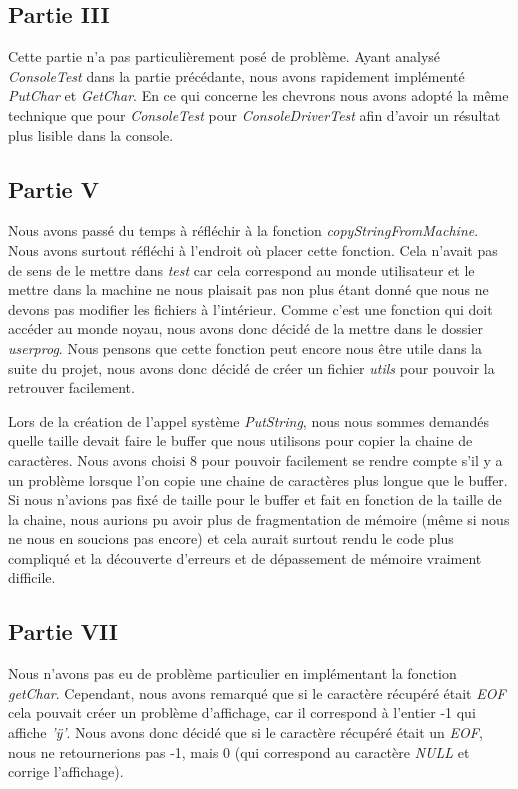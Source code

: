 \documentclass{article}
\begin{document}
\subsection{Partie III}
Cette partie n'a pas particulièrement posé de problème. Ayant analysé
\textit{ConsoleTest} dans la partie précédante, nous avons rapidement
implémenté \textit{PutChar} et \textit{GetChar}. En ce qui concerne les
chevrons nous avons adopté la même technique que pour \textit{ConsoleTest} pour
\textit{ConsoleDriverTest} afin d'avoir un résultat plus lisible dans la
console.

\subsection{Partie V}
Nous avons passé du temps à réfléchir à la fonction
\textit{copyStringFromMachine}. Nous avons surtout réfléchi à l'endroit où
placer cette fonction. Cela n'avait pas de sens de le mettre dans \textit{test}
car cela correspond au monde utilisateur et le mettre dans la machine ne nous
plaisait pas non plus étant donné que nous ne devons pas modifier les fichiers
à l'intérieur. Comme c'est une fonction qui doit accéder au monde noyau, nous
avons donc décidé de la mettre dans le dossier \textit{userprog}. Nous pensons
que cette fonction peut encore nous être utile dans la suite du projet, nous
avons donc décidé de créer un fichier \textit{utils} pour pouvoir la retrouver
facilement.

Lors de la création de l'appel système \textit{PutString}, nous nous sommes
demandés quelle taille devait faire le buffer que nous utilisons pour copier la
chaine de caractères. Nous avons choisi 8 pour pouvoir facilement se rendre
compte s'il y a un problème lorsque l'on copie une chaine de caractères plus
longue que le buffer. Si nous n'avions pas fixé de taille pour le buffer et
fait en fonction de la taille de la chaine, nous aurions pu avoir plus de
fragmentation de mémoire (même si nous ne nous en soucions pas encore) et cela
aurait surtout rendu le code plus compliqué et la découverte d'erreurs et de
dépassement de mémoire vraiment difficile.

\subsection{Partie VII} \label{bugPartieVII}
Nous n'avons pas eu de problème particulier en implémentant la fonction
\textit{getChar}. Cependant, nous avons remarqué que si le caractère récupéré
était \textit{EOF} cela pouvait créer un problème d'affichage, car il
correspond à l'entier -1 qui affiche \textit{'ÿ'}. Nous avons donc décidé que
si le caractère récupéré était un \textit{EOF}, nous ne retournerions pas -1,
mais 0 (qui correspond au caractère \textit{NULL} et corrige l'affichage).
\end{document}
